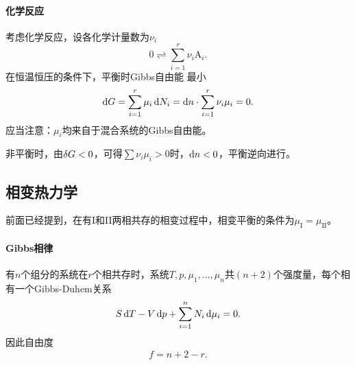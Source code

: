 \paragraph*{化学反应}
考虑化学反应，设各化学计量数为$\nu_i$
\[
	0\rightleftharpoons\sum_{i=1}^r\nu_i{\mathrm A}_i.
\]
在恒温恒压的条件下，平衡时Gibbs自由能%
最小
\begin{align}
	\mathop{}\!\mathrm{d} G=\sum_{i=1}^r\mu_i\mathop{}\!\mathrm{d} N_i=\mathop{}\!\mathrm{d} n\cdot\sum_{i=1}^r\nu_i\mu_i=0.
\end{align}
应当注意：$\mu_i$均来自于混合系统的Gibbs自由能。

非平衡时，由$\mathop{}\!\delta G<0$，可得$\textstyle\sum\nu_i\mu_i>0$时，$\mathop{}\!\mathrm{d} n<0$，平衡逆向进行。
\iffalse
考虑一个由理想气体参与的化学反应，理想气体的化学势
\[
	\mu_i=RT\ln p_i+\cns(T).
\]
带入上式可得，有
\[
	\sum_{i=1}^r\nu_iRT\ln p_i=\cns(T).
\]
又$p=RT\zkh{{\rm A}_i}$，%
\begin{align}
	\prod_{i=1}^r\zkh{{\rm A}_i}^{\nu_i}=:K(T).
\end{align}
$K$称为化学平衡常数，是$T$的函数。
\fi
\subsection{相变热力学}
前面已经提到，在有I和II两相共存的相变过程中，相变平衡的条件为$\mu_\mathrm I=\mu_\mathrm{II}$。

\paragraph*{Gibbs相律}有$n$个组分的系统在$r$个相共存时，系统$T,p,\mu_1,\ldots,\mu_n$共$(n+2)$个强度量，每个相有一个Gibbs-Duhem关系
\[
	S\mathop{}\!\mathrm{d} T-V\mathop{}\!\mathrm{d} p+\sum_{i=1}^nN_i\mathop{}\!\mathrm{d}\mu_i=0.
\]
因此自由度
\begin{align}
	f=n+2-r.
\end{align}
